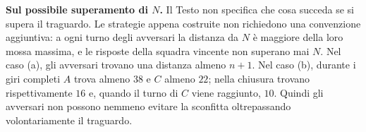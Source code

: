 {\textbf{Sul possibile superamento di $N$.}
Il Testo non specifica che cosa succeda se si supera il traguardo.
Le strategie appena costruite non richiedono una convenzione aggiuntiva:
a ogni turno degli avversari la distanza da $N$ \`e maggiore della loro
mossa massima, e le risposte della squadra vincente non superano mai $N$.
Nel caso (a), gli avversari trovano una distanza almeno $n+1$.
Nel caso (b), durante i giri completi $A$ trova almeno $38$ e $C$
almeno $22$; nella chiusura trovano rispettivamente $16$ e, quando
il turno di $C$ viene raggiunto, $10$.
Quindi gli avversari non possono nemmeno evitare la sconfitta
oltrepassando volontariamente il traguardo.
}
\renewcommand{\SoluzioniAlternative}{}
\renewcommand{\Osservazioni}{}
\renewcommand{\Commenti}{}
